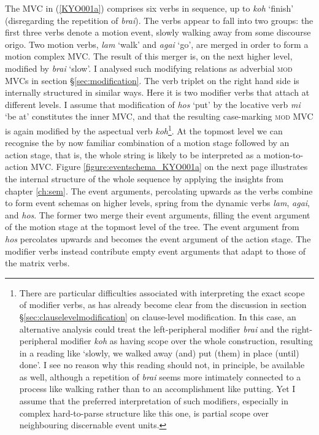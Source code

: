 The MVC in (\ref{KYO001a}) comprises six verbs in sequence, up to \textit{koh} `finish' (disregarding the repetition of \textit{brai}). The verbs appear to fall into two groups: the first three verbs denote a motion event, slowly walking away from some discourse origo. Two motion verbs, \textit{lam} `walk' and \textit{agai} `go', are merged in order to form a motion complex MVC. The result of this merger is, on the next higher level, modified by \textit{brai} `slow'. I analysed such modifying relations as adverbial \textsc{mod} MVCs in section §\ref{sec:modification}. The verb triplet on the right hand side is internally structured in similar ways. Here it is two modifier verbs that attach at different levels. I assume that modification of \textit{hos} `put' by the locative verb \textit{mi} `be at' constitutes the inner MVC, and that the resulting case-marking \textsc{mod} MVC is again modified by the aspectual verb \textit{koh}\footnote{There are particular difficulties associated with interpreting the exact scope of modifier verbs, as has already become clear from the discussion in section §\ref{sec:clauselevelmodification} on clause-level modification. In this case, an alternative analysis could treat the left-peripheral modifier \textit{brai} and the right-peripheral modifier \textit{koh} as having scope over the whole construction, resulting in a reading like `slowly, we walked away (and) put (them) in place (until) done'. I see no reason why this reading should not, in principle, be available as well, although a repetition of \textit{brai} seems more intimately connected to a process like walking rather than to an accomplishment like putting. Yet I assume that the preferred interpretation of such modifiers, especially in complex hard-to-parse structure like this one, is partial scope over neighbouring discernable event units.}. At the topmost level we can recognise the by now familiar combination of a motion stage followed by an action stage, that is, the whole string is likely to be interpreted as a motion-to-action MVC. Figure \ref{figure:eventschema_KYO001a} on the next page illustrates the internal structure of the whole sequence by applying the insights from chapter \ref{ch:sem}. The event arguments, percolating upwards as the verbs combine to form event schemas on higher levels, spring from the dynamic verbs \textit{lam}, \textit{agai}, and \textit{hos}. The former two merge their event arguments, filling the event argument of the motion stage at the topmost level of the tree. The event argument from \textit{hos} percolates upwards and becomes the event argument of the action stage. The modifier verbs instead contribute empty event arguments that adapt to those of the matrix verbs.

